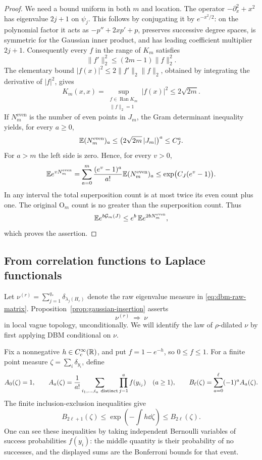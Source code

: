 \begin{proof}
We need a bound uniform in both \(m\) and location.
The operator \(-\partial_x^2+x^2\) has eigenvalue \(2j+1\) on
\(\psi_j\). This follows by conjugating it by \(e^{-x^2/2}\):
on the polynomial factor it acts as
\(-p''+2xp'+p\), preserves successive degree spaces, is symmetric
for the Gaussian inner product, and has leading coefficient
multiplier \(2j+1\).
Consequently every \(f\) in the range of \(K_m\) satisfies
\[
 \|f'\|_2^2\le(2m-1)\|f\|_2^2.
\]
The elementary bound
\(|f(x)|^2\le2\|f'\|_2\|f\|_2\), obtained by integrating the
derivative of \(|f|^2\), gives
\[
 K_m(x,x)
   =\sup_{\substack{f\in\operatorname{Ran}K_m\\\|f\|_2=1}}
       |f(x)|^2
   \le2\sqrt{2m}.
\]
If \(N_m^{\mathrm{even}}\) is the number of even points in \(J_m\),
the Gram determinant inequality yields, for every \(a\ge0\),
\[
 \mathbb E(N_m^{\mathrm{even}})_a
   \le \bigl(2\sqrt{2m}\,|J_m|\bigr)^a\le C_J^a.
\]
For \(a>m\) the left side is zero. Hence, for every \(v>0\),
\[
 \mathbb E e^{vN_m^{\mathrm{even}}}
   =\sum_{a=0}^m
       \frac{(e^v-1)^a}{a!}\mathbb E(N_m^{\mathrm{even}})_a
   \le\exp\bigl(C_J(e^v-1)\bigr).
\]
In any interval the total superposition count is at most twice
its even count plus one. The original \(\mathrm O_m\) count is
no greater than the superposition count. Thus
\[
 \mathbb E e^{b\mathcal G_m(J)}
   \le e^b\,\mathbb E e^{2bN_m^{\mathrm{even}}},
\]
which proves the assertion.
\end{proof}

\subsection{From correlation functions to Laplace functionals}

Let \(\nu^{(r)}=\sum_{j=1}^{q_*}\delta_{\lambda_j(H_r)}\) denote
the raw eigenvalue measure in \eqref{eq:dbm-raw-matrix}.
Proposition~\ref{prop:gaussian-insertion} asserts
\begin{equation}
 \label{eq:dbm-insertion-limit}
 \nu^{(r)}\ \Longrightarrow\ \nu
\end{equation}
in local vague topology, unconditionally. We will identify the law
of \(\rho\)-dilated \(\nu\) by first applying DBM conditional on \(\nu\).

Fix a nonnegative \(h\in C_c^\infty(\mathbb R)\), and put
\(f=1-e^{-h}\), so \(0\le f\le1\). For a finite point measure
\(\zeta=\sum_i\delta_{y_i}\), define
\[
 A_0(\zeta)=1,\qquad
 A_a(\zeta)=\frac1{a!}
    \sum_{i_1,\ldots,i_a\ {\rm distinct}}
        \prod_{j=1}^a f(y_{i_j})\quad(a\ge1),
 \qquad
 B_\ell(\zeta)=\sum_{a=0}^{\ell}(-1)^aA_a(\zeta).
\]
The finite inclusion-exclusion inequalities give
\begin{equation}
 \label{eq:dbm-bonferroni}
 B_{2\ell+1}(\zeta)
   \le \exp\left(-\int h\dd\zeta\right)
   \le B_{2\ell}(\zeta).
\end{equation}
One can see these inequalities by taking independent Bernoulli
variables of success probabilities \(f(y_i)\): the middle quantity
is their probability of no successes, and the displayed sums are
the Bonferroni bounds for that event.

